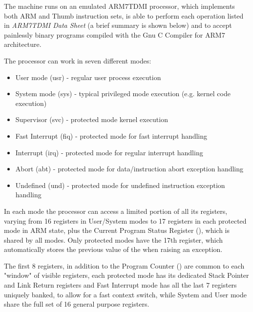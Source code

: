 The \uarm{} machine runs on an emulated ARM7TDMI processor, which implements both ARM and Thumb instruction sets, is able to perform each operation listed in \emph{ARM7TDMI Data Sheet} (a brief summary is shown below) and to accept painlessly binary programs compiled with the Gnu C Compiler for ARM7 architecture.

\label{sec:man:processorRegisters}
The processor can work in seven different modes:
\begin{itemize}
\item User mode (usr) - regular user process execution
\item System mode (sys) - typical privileged mode execution (e.g. kernel code execution)
\item Supervisor (svc) - protected mode kernel execution
\item Fast Interrupt (fiq) - protected mode for fast interrupt handling
\item Interrupt (irq) - protected mode for regular interrupt handling
\item Abort (abt) - protected mode for data/instruction abort exception handling
\item Undefined (und) - protected mode for undefined instruction exception handling
\end{itemize}

In each mode the processor can access a limited portion of all its registers, varying from 16 registers in User/System modes to 17 registers in each protected mode in ARM state, plus the Current Program Status Register (), which is shared by all modes.
Only protected modes have the 17th register, which automatically stores the previous value of the  when raising an exception.

The first 8 registers, in addition to the Program Counter () are common to each "window" of visible registers, each protected mode has its dedicated Stack Pointer and Link Return registers and Fast Interrupt mode has all the last 7 registers uniquely banked, to allow for a fast context switch, while System and User mode share the full set of 16 general purpose registers.

\vspace{5px}
\begin{adjustbox}{center}

\end{adjustbox}
\vspace{5px}

